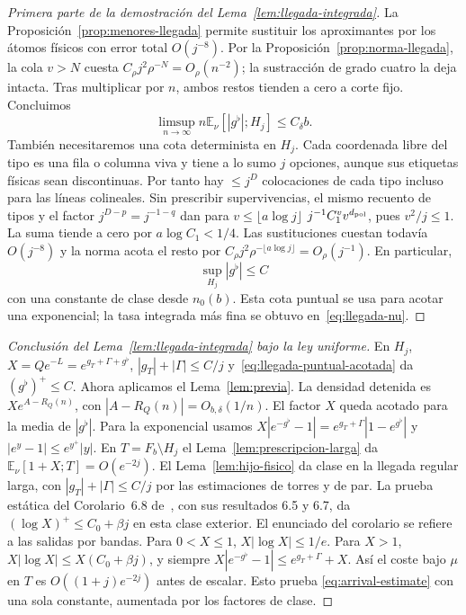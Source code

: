 \begin{proof}[Primera parte de la demostración del Lema~\ref{lem:llegada-integrada}]
La Proposición~\ref{prop:menores-llegada} permite sustituir los aproximantes por los
átomos físicos con error total \(O(j^{-8})\). Por la Proposición~\ref{prop:norma-llegada},
la cola \(v>N\) cuesta \(C_\rho j^2\rho^{-N}=O_\rho(n^{-2})\); la sustracción de
grado cuatro la deja intacta. Tras multiplicar por \(n\), ambos restos tienden a cero
a corte fijo. Concluimos
\begin{equation}\label{eq:llegada-nu}
 \limsup_{n\to\infty} n\mathbb E_\nu[|g^\flat|;H_j]\le C_\delta b .
\end{equation}
También necesitaremos una cota determinista en \(H_j\). Cada coordenada libre del tipo
es una fila o columna viva y tiene a lo sumo \(j\) opciones, aunque sus etiquetas físicas
sean discontinuas. Por tanto hay \(\le j^D\) colocaciones de cada tipo incluso para
las líneas colineales. Sin prescribir supervivencias, el mismo recuento de tipos y el
factor \(j^{D-p}=j^{-1-q}\) dan para \(v\le\lfloor a\log j\rfloor\)
\(j^{-1}C_1^v v^{d_{\rm pol}}\), pues \(v^2/j\le1\). La suma tiende a cero por
\(a\log C_1<1/4\). Las sustituciones cuestan todavía \(O(j^{-8})\) y la norma acota el
resto por \(C_\rho j^2\rho^{-\lfloor a\log j\rfloor}=O_\rho(j^{-1})\). En particular,
\begin{equation}\label{eq:llegada-puntual-acotada}
 \sup_{H_j}|g^\flat|\le C
\end{equation}
con una constante de clase desde \(n_0(b)\). Esta cota puntual se usa para acotar una
exponencial; la tasa integrada más fina se obtuvo en~\eqref{eq:llegada-nu}.
\end{proof}

\begin{proof}[Conclusión del Lema~\ref{lem:llegada-integrada} bajo la ley uniforme]
En \(H_j\), \(X=Qe^{-L}=e^{g_T+\Gamma+g^\flat}\), \(|g_T|+|\Gamma|\le C/j\)
y~\eqref{eq:llegada-puntual-acotada} da \((g^\flat)^+\le C\). Ahora aplicamos el
Lema~\ref{lem:previa}. La densidad detenida es \(Xe^{A-R_Q(n)}\), con
\(|A-R_Q(n)|=O_{b,\delta}(1/n)\). El factor \(X\) queda acotado para la media de
\(|g^\flat|\). Para la exponencial usamos
\(X|e^{-g^\flat}-1|=e^{g_T+\Gamma}|1-e^{g^\flat}|\) y \(|e^y-1|\le e^{y^+}|y|\).
En \(T=F_b\setminus H_j\) el Lema~\ref{lem:prescripcion-larga} da
\(\mathbb E_\nu[1+X;T]=O(e^{-2j})\). El Lema~\ref{lem:hijo-fisico} da clase en la llegada
regular larga, con \(|g_T|+|\Gamma|\le C/j\) por las estimaciones de torres y de par.
La prueba estática del Corolario~6.8 de~\cite{tc}, con sus resultados 6.5 y 6.7, da
\((\log X)^+\le C_0+\beta j\) en esta clase exterior. El enunciado del corolario se
refiere a las salidas por bandas.
Para \(0<X\le1\), \(X|\log X|\le1/e\). Para \(X>1\),
\(X|\log X|\le X(C_0+\beta j)\), y siempre \(X|e^{-g^\flat}-1|\le e^{g_T+\Gamma}+X\).
Así el coste bajo \(\mu\) en \(T\) es \(O((1+j)e^{-2j})\) antes de escalar. Esto prueba
\eqref{eq:arrival-estimate} con una sola constante, aumentada por los factores de clase.
\end{proof}


